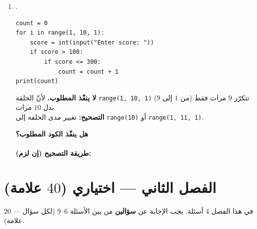 \documentclass[14pt]{extarticle}
\begin{document}
\begin{enumerate}[label=\textbf{السؤال \arabic*:}, wide=0pt, itemsep=2.2em]
\begin{enumerate}[label=\textbf{مقطع \alph*:}, wide=0pt, itemsep=1.5em]
\item .
\begin{boxCode}
\begin{english}
\begin{verbatim}
count = 0
for i in range(1, 10, 1):
    score = int(input("Enter score: "))
    if score > 100:
        if score <= 300:
            count = count + 1
print(count)
\end{verbatim}
\end{english}
\end{boxCode}
\ifwithsols
\begin{boxSolution}
\textbf{لا ينفّذ المطلوب.} لأنّ الحلقة \textenglish{\texttt{range(1, 10, 1)}} تتكرّر $9$ مرات فقط (من $1$ إلى $9$) بدل $10$ مرات. \\
\textbf{التصحيح:} تغيير مدى الحلقة إلى \textenglish{\texttt{range(10)}} أو \textenglish{\texttt{range(1, 11, 1)}}.
\end{boxSolution}
\else
\vspace{0.5cm}
\textbf{هل ينفّذ الكود المطلوب؟} \hrulefill \\
 \\
\textbf{طريقة التصحيح (إن لزم):} \hrulefill
\fi
\filbreak

\end{enumerate}
\filbreak

\end{enumerate}

\clearpage
\section*{الفصل الثاني — اختياري ($40$ علامة)}
في هذا الفصل $4$ أسئلة. يجب الإجابة عن \textbf{سؤالين} من بين الأسئلة $6$–$9$ (لكل سؤال — $20$ علامة).
\end{document}
